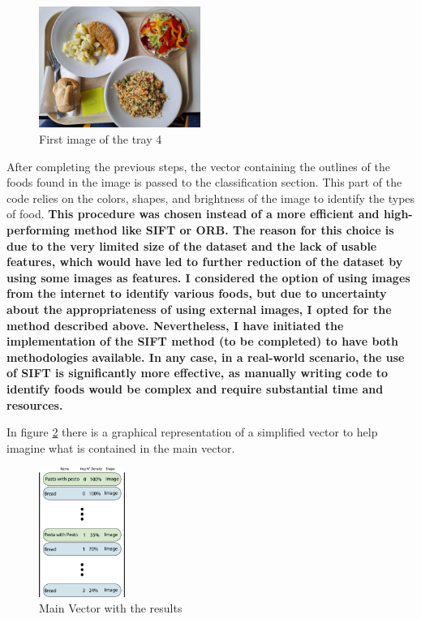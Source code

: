 \documentclass[
	a4paper, %
	10pt, %
	unnumberedsections, %
	twoside, %
]{LTJournalArticle}
\begin{document}
\begin{figure}[t]
    \centering
    \includegraphics[width=0.47\textwidth]{Images/food_image_tray4.1.jpg}
    \caption{First image of the tray 4}
    \label{fig:tray4.1}
\end{figure}

After completing the previous steps, the vector containing the outlines of the foods found in the image is passed to the classification section. This part of the code relies on the colors, shapes, and brightness of the image to identify the types of food. \textbf{This procedure was chosen instead of a more efficient and high-performing method like SIFT or ORB. The reason for this choice is due to the very limited size of the dataset and the lack of usable features, which would have led to further reduction of the dataset by using some images as features. I considered the option of using images from the internet to identify various foods, but due to uncertainty about the appropriateness of using external images, I opted for the method described above. Nevertheless, I have initiated the implementation of the SIFT method (to be completed) to have both methodologies available. In any case, in a real-world scenario, the use of SIFT is significantly more effective, as manually writing code to identify foods would be complex and require substantial time and resources.}

In figure \ref{fig:Vector} there is a graphical representation of a simplified vector to help imagine what is contained in the main vector.

\begin{figure}[t]
    \centering
    \includegraphics[width=0.25\textwidth]{Images/Vector.png}
    \caption{Main Vector with the results}
    \label{fig:Vector}
\end{figure}
\end{document}
